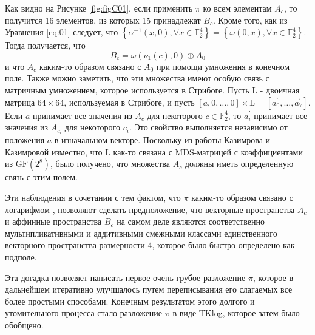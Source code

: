 Как видно на Рисунке \ref{fig:figC01}, если применить $\pi$ ко всем элементам $A_{c}$, то получится 16 элементов, из которых 15 принадлежат $B_{c}$. Кроме того, как из Уравнения \ref{eq:01} следует, что $\left\{\alpha^{-1}(x, 0), \forall x \in \mathbb{F}_{2}^{4}\right\}=\left\{\omega(0, x), \forall x \in \mathbb{F}_{2}^{4}\right\}$. Тогда получается, что
$$
B_{c}=\omega\left(\nu_{1}(c), 0\right) \oplus A_{0}
$$
и что $A_{c}$ каким-то образом связано с $A_{0}$ при помощи умножения в конечном поле. Также можно заметить, что эти множества имеют особую связь с матричным умножением, которое используется в Стрибоге. Пусть L - двоичная матрица $64 \times 64$, используемая в Стрибоге, и пусть $[a, 0, \ldots, 0] \times \mathrm{L}=\left[a_{0}^{\prime}, \ldots, a_{7}^{\prime}\right]$. Если $a$ принимает все значения из $A_{c}$ для некоторого $c \in \mathbb{F}_{2}^{4}$, то $a_{i}^{\prime}$ принимает все значения из $A_{c_{i}}$ для некоторого $c_{i}$. Это свойство выполняется независимо от положения $a$ в изначальном векторе. Поскольку из работы Казимрова и Казимровой \cite{KK13} изместно, что L как-то связана с MDS-матрицей с коэффициентами из $\mathrm{GF}\left(2^{8}\right)$, было получено, что множества $A_{c}$ должны иметь определенную связь с этим полем.

Эти наблюдения в сочетании с тем фактом, что $\pi$ каким-то образом связано с логарифмом \cite{PU16}, позволяют сделать предположение, что векторные пространства $A_{c}$ и аффинные пространства $B_{c}$ на самом деле являются соответственно мультипликативными и аддитивными смежными классами единственного векторного пространства размерности 4, которое было быстро определено как подполе.

Эта догадка позволяет написать первое очень грубое разложение $\pi$, которое в дальнейшем итеративно улучшалось путем переписывания его слагаемых все более простыми способами. Конечным результатом этого долгого и утомительного процесса стало разложение $\pi$ в виде TKlog, которое затем было обобщено.